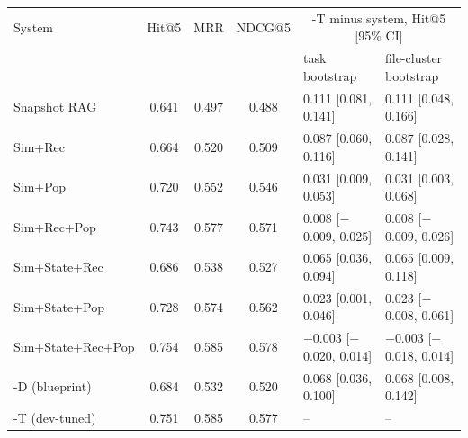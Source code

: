 \begin{tabular}{lcccll}
\toprule
System & Hit@5 & MRR & NDCG@5 & \multicolumn{2}{c}{\sys{}-T minus system, Hit@5 [95\% CI]} \\
 & & & & task bootstrap & file-cluster bootstrap \\
\midrule
Snapshot RAG & 0.641 & 0.497 & 0.488 & 0.111 [0.081, 0.141] & 0.111 [0.048, 0.166] \\
Sim+Rec & 0.664 & 0.520 & 0.509 & 0.087 [0.060, 0.116] & 0.087 [0.028, 0.141] \\
Sim+Pop & 0.720 & 0.552 & 0.546 & 0.031 [0.009, 0.053] & 0.031 [0.003, 0.068] \\
Sim+Rec+Pop & 0.743 & 0.577 & 0.571 & 0.008 [$-$0.009, 0.025] & 0.008 [$-$0.009, 0.026] \\
Sim+State+Rec & 0.686 & 0.538 & 0.527 & 0.065 [0.036, 0.094] & 0.065 [0.009, 0.118] \\
Sim+State+Pop & 0.728 & 0.574 & 0.562 & 0.023 [0.001, 0.046] & 0.023 [$-$0.008, 0.061] \\
Sim+State+Rec+Pop & 0.754 & 0.585 & 0.578 & $-$0.003 [$-$0.020, 0.014] & $-$0.003 [$-$0.018, 0.014] \\
\sys{}-D (blueprint) & 0.684 & 0.532 & 0.520 & 0.068 [0.036, 0.100] & 0.068 [0.008, 0.142] \\
\midrule
\sys{}-T (dev-tuned) & 0.751 & 0.585 & 0.577 & -- & -- \\
\bottomrule
\end{tabular}